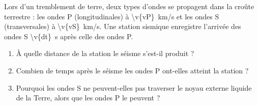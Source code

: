 Lors d'un tremblement de terre, deux types d'ondes se propagent dans la croûte terrestre : les ondes P (longitudinales) à \qty{\v{vP}}{km/s} et les ondes S (transversales) à \qty{\v{vS}}{km/s}. Une station sismique enregistre l'arrivée des ondes S \qty{\v{dt}}{s} après celle des ondes P.

\begin{enumerate}[label=\alph*)]
    \item À quelle distance de la station le séisme s'est-il produit ?
    \item Combien de temps après le séisme les ondes P ont-elles atteint la station ?
    \item Pourquoi les ondes S ne peuvent-elles pas traverser le noyau externe liquide de la Terre, alors que les ondes P le peuvent ?
\end{enumerate}
